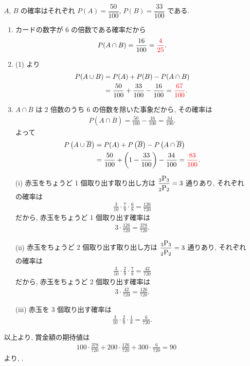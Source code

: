 $A$, $B$ の確率はそれぞれ $P(A) = \dfrac{50}{100}$, $P(B) = \dfrac{33}{100}$ である.
\begin{enumerate}
	\item{
		カードの数字が 6 の倍数である確率だから
		\begin{align}
			P(A\cap B) = \frac{16}{100} = \textcolor{red}{\frac{4}{25}}.
		\end{align}
	}
	\item{
		(1) より
		\begin{align}
			P(A\cup B) &= P(A) + P(B) - P(A\cap B) \\
				&= \frac{50}{100} + \frac{33}{100} - \frac{16}{100} = \textcolor{red}{\frac{67}{100}}.
		\end{align}
	}
	\item{
		$A\cap\overline{B}$ は 2 倍数のうち 6 の倍数を除いた事象だから, その確率は
		\begin{align}
			P\left(A\cap\overline{B}\right) = \frac{50}{100} - \frac{16}{100} = \frac{34}{100}.
		\end{align}
		よって
		\begin{align}
			P\left(A\cup\overline{B}\right) &= P(A) + P\left(\overline{B}\right) - P\left(A\cap\overline{B}\right) \\
				&= \frac{50}{100} + \left(1 - \frac{33}{100}\right) - \frac{34}{100} = \textcolor{red}{\frac{83}{100}}.
		\end{align}
	}
\end{enumerate}

\begin{enumerate}
	\item[(i)]{
		赤玉をちょうど 1 個取り出す取り出し方は $\dfrac{{{}_{3}\mathrm{P}_{3}}}{{{}_{2}\mathrm{P}_{2}}} = 3$ 通りあり, それぞれの確率は
		\begin{align}
			\frac{3}{10}\cdot\frac{7}{9}\cdot\frac{6}{8} = \frac{126}{720}
		\end{align}
		だから, 赤玉をちょうど 1 個取り出す確率は
		\begin{align}
			3\cdot\frac{126}{720} = \frac{378}{720}.
		\end{align}
	}
	\item[(ii)]{
		赤玉をちょうど 2 個取り出す取り出し方は $\dfrac{{{}_{3}\mathrm{P}_{3}}}{{{}_{2}\mathrm{P}_{2}}} = 3$ 通りあり, それぞれの確率は
		\begin{align}
			\frac{3}{10}\cdot\frac{2}{9}\cdot\frac{7}{8} = \frac{42}{720}
		\end{align}
		だから, 赤玉をちょうど 2 個取り出す確率は
		\begin{align}
			3\cdot\frac{42}{720} = \frac{126}{720}.
		\end{align}
	}
	\item[(iii)]{
		赤玉を 3 個取り出す確率は
		\begin{align}
			\frac{3}{10}\cdot\frac{2}{9}\cdot\frac{1}{8} = \frac{6}{720}.
		\end{align}
	}
\end{enumerate}
以上より, 賞金額の期待値は
\begin{align}
	100\cdot\frac{378}{720} + 200\cdot\frac{126}{720} + 300\cdot\frac{6}{720} = 90
\end{align}
より, .

